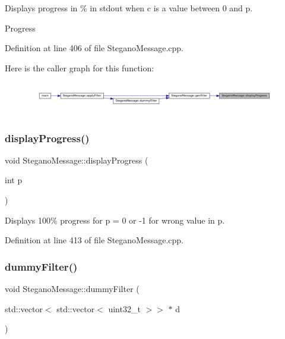 Displays progress in \% in stdout when c is a value between 0 and p. 

Progress 

Definition at line 406 of file Stegano\+Message.\+cpp.

Here is the caller graph for this function\+:\nopagebreak
\begin{figure}[H]
\begin{center}
\leavevmode
\includegraphics[width=350pt]{classSteganoMessage_a50936bb2352eaaa1112280c2ac3ca2d5_icgraph}
\end{center}
\end{figure}
\mbox{\label{classSteganoMessage_aa6e24f6ed5afcf38dcba28fb91a74d21}} 
\subsubsection{\texorpdfstring{displayProgress()}{displayProgress()}\hspace{0.1cm}{\footnotesize\ttfamily [2/2]}}
{\footnotesize\ttfamily void Stegano\+Message\+::display\+Progress (\begin{DoxyParamCaption}\item[{int}]{p }\end{DoxyParamCaption})\hspace{0.3cm}{\ttfamily [private]}}



Displays 100\% progress for p = 0 or -\/1 for wrong value in p. 



Definition at line 413 of file Stegano\+Message.\+cpp.

\mbox{\label{classSteganoMessage_a1a26242c2e6d146cba1ad6831ab60ba7}} 
\subsubsection{\texorpdfstring{dummyFilter()}{dummyFilter()}}
{\footnotesize\ttfamily void Stegano\+Message\+::dummy\+Filter (\begin{DoxyParamCaption}\item[{std\+::vector$<$ std\+::vector$<$ uint32\+\_\+t $>$$>$ $\ast$}]{d }\end{DoxyParamCaption})\hspace{0.3cm}{\ttfamily [private]}}



